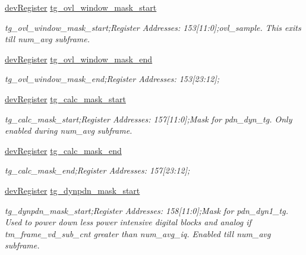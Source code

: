 \begin{DoxyCompactItemize}
\mbox{\hyperlink{classdev_register}{dev\+Register}} \mbox{\hyperlink{class_o_p_t3101_registers_a13d16e5bb5ca0aa673b9efefac75addc}{tg\+\_\+ovl\+\_\+window\+\_\+mask\+\_\+start}}
\begin{DoxyCompactList}\small\item\em tg\+\_\+ovl\+\_\+window\+\_\+mask\+\_\+start;Register Addresses\+: 153\mbox{[}11\+:0\mbox{]};ovl\+\_\+sample. This exits till num\+\_\+avg subframe. \end{DoxyCompactList}\item 
\mbox{\hyperlink{classdev_register}{dev\+Register}} \mbox{\hyperlink{class_o_p_t3101_registers_a332feeb9d0d02a37ea3eaf3d28e463f9}{tg\+\_\+ovl\+\_\+window\+\_\+mask\+\_\+end}}
\begin{DoxyCompactList}\small\item\em tg\+\_\+ovl\+\_\+window\+\_\+mask\+\_\+end;Register Addresses\+: 153\mbox{[}23\+:12\mbox{]}; \end{DoxyCompactList}\item 
\mbox{\hyperlink{classdev_register}{dev\+Register}} \mbox{\hyperlink{class_o_p_t3101_registers_a6673834c3183fb9538a6345569196d7e}{tg\+\_\+calc\+\_\+mask\+\_\+start}}
\begin{DoxyCompactList}\small\item\em tg\+\_\+calc\+\_\+mask\+\_\+start;Register Addresses\+: 157\mbox{[}11\+:0\mbox{]};Mask for pdn\+\_\+dyn\+\_\+tg. Only enabled during num\+\_\+avg subframe. \end{DoxyCompactList}\item 
\mbox{\hyperlink{classdev_register}{dev\+Register}} \mbox{\hyperlink{class_o_p_t3101_registers_adc9bcb1f45a6fda0447bce5bfa5074f0}{tg\+\_\+calc\+\_\+mask\+\_\+end}}
\begin{DoxyCompactList}\small\item\em tg\+\_\+calc\+\_\+mask\+\_\+end;Register Addresses\+: 157\mbox{[}23\+:12\mbox{]}; \end{DoxyCompactList}\item 
\mbox{\hyperlink{classdev_register}{dev\+Register}} \mbox{\hyperlink{class_o_p_t3101_registers_a6830ce377ff973553d01d458d7fcae11}{tg\+\_\+dynpdn\+\_\+mask\+\_\+start}}
\begin{DoxyCompactList}\small\item\em tg\+\_\+dynpdn\+\_\+mask\+\_\+start;Register Addresses\+: 158\mbox{[}11\+:0\mbox{]};Mask for pdn\+\_\+dyn1\+\_\+tg. Used to power down less power intensive digital blocks and analog if tm\+\_\+frame\+\_\+vd\+\_\+sub\+\_\+cnt greater than num\+\_\+avg\+\_\+iq. Enabled till num\+\_\+avg subframe. \end{DoxyCompactList}\item 

\end{DoxyCompactItemize}
